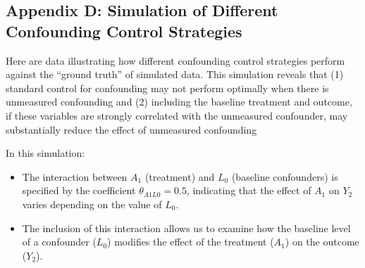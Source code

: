 \documentclass[
  singlecolumn]{article}
\providecommand{\tightlist}{%
  \setlength{\itemsep}{0pt}\setlength{\parskip}{0pt}}\usepackage{longtable,booktabs,array}
\begin{document}
\subsection{Appendix D: Simulation of Different Confounding Control
Strategies}\label{appendix-d-simulation-of-different-confounding-control-strategies}

Here are data illustrating how different confounding control strategies
perform against the ``ground truth'' of simulated data. This simulation
reveals that (1) standard control for confounding may not perform
optimally when there is unmeasured confounding and (2) including the
baseline treatment and outcome, if these variables are strongly
correlated with the unmeasured confounder, may substantially reduce the
effect of unmeasured confounding

In this simulation:

\begin{itemize}
\tightlist
\item
  The interaction between \(A_1\) (treatment) and \(L_0\) (baseline
  confounders) is specified by the coefficient \(\theta_{A1L0} = 0.5\),
  indicating that the effect of \(A_1\) on \(Y_2\) varies depending on
  the value of \(L_0\).
\item
  The inclusion of this interaction allows us to examine how the
  baseline level of a confounder (\(L_0\)) modifies the effect of the
  treatment (\(A_1\)) on the outcome (\(Y_2\)).
\end{itemize}
\end{document}
